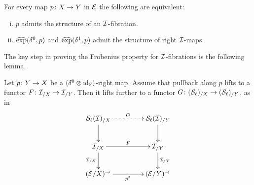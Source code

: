 \documentclass[reqno,10pt,a4paper,oneside]{amsart}
\begin{document}
\begin{proposition} \label{prod-exp-general}
For every map $p \co X \to Y$ in $\cal{E}$ 
 the following are equivalent: 
\begin{enumerate}[(i)]
\item $p$ admits the structure of an $\cal{I}$-fibration. 
\item $\hatexp(\lcyl, p)$ and $\hatexp(\rcyl, p)$ admit the structure of right $\cal{I}$-maps.
\end{enumerate} 
\end{proposition}



\medskip

The key step in proving the Frobenius property
for $\cal{I}$-fibrations is the following lemma.

\begin{lemma}
\label{strong-h-equiv-base-change-along-fibration}
Let $p \co Y \to X$ be a $(\lcyl \otimes \id_{\calE})$-right map.
Assume that pullback  along $p$ lifts to a functor $F \co \cal{I}_{/X} \to \cal{I}_{/Y}$.
Then it lifts further to a functor $G \co (\cal{S}_\ell)_{/X} \to (\cal{S}_\ell)_{/Y}$, as in
\[
\xymatrix@C+2em{
  \cal{S}_\ell(\cal{I})_{/X}
  \ar@{.>}[r]^{G}
  \ar[d]
&
  \cal{S}_\ell(\cal{I})_{/Y}
  \ar[d]
\\
  \cal{I}_{/X}
  \ar[r]^{F}
  \ar[d]_{\cal{I}_{/X}}
&
  \cal{I}_{/Y}
  \ar[d]^{\cal{I}_{/Y}}
\\
  (\catE / X)^{\to}
  \ar[r]_{p^*}
&
  (\catE / Y)^{\to}
}
\]
\end{lemma}
\end{document}
